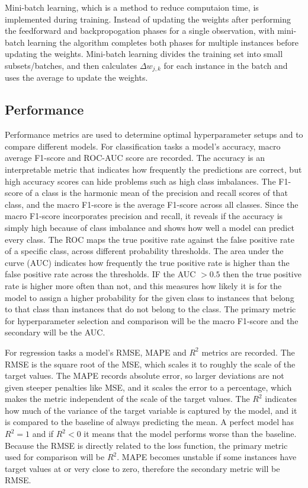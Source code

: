 \documentclass[conference]{IEEEtran}
\begin{document}
	Mini-batch learning, which is a method to reduce computaion time, is implemented during training. Instead of updating the weights after performing the feedforward and backpropogation phases for a single observation, with mini-batch learning the algorithm completes both phases for multiple instances before updating the weights. Mini-batch learning divides the training set into small subsets/batches, and then calculates $\Delta w_{j, k}$ for each instance in the batch and uses the average to update the weights.
	
	\subsection{Performance}
	\label{met:performance}
	Performance metrics are used to determine optimal hyperparameter setups and to compare different models. For classification tasks a model's accuracy, macro average F1-score and ROC-AUC score are recorded. The accuracy is an interpretable metric that indicates how frequently the predictions are correct, but high accuracy scores can hide problems such as high class imbalances. The F1-score of a class is the harmonic mean of the precision and recall scores of that class, and the macro F1-score is the average F1-score across all classes. Since the macro F1-score incorporates precision and recall, it reveals if the accuracy is simply high because of class imbalance and shows how well a model can predict every class. The ROC maps the true positive rate against the false positive rate of a specific class, across different probability thresholds. The area under the curve (AUC) indicates how frequently the true positive rate is higher than the false positive rate across the thresholds. IF the AUC $> 0.5$ then the true positive rate is higher more often than not, and this measures how likely it is for the model to assign a higher probability for the given class to instances that belong to that class than instances that do not belong to the class.  The primary metric for hyperparameter selection and comparison will be the macro F1-score and the secondary will be the AUC.
	
	For regression tasks a model's RMSE, MAPE and $R^2$ metrics are recorded. The RMSE is the square root of the MSE, which scales it to roughly the scale of the target values. The MAPE records absolute error, so larger deviations are not given steeper penalties like MSE, and it scales the error to a percentage, which makes the metric independent of the scale of the target values. The $R^2$ indicates how much of the variance of the target variable is captured by the model, and it is compared to the baseline of always predicting the mean. A perfect model has $R^2 = 1$ and if $R^2 < 0$ it means that the model performs worse than the baseline. Because the RMSE is directly related to the loss function, the primary metric used for comparison will be $R^2$. MAPE becomes unstable if some instances have target values at or very close to zero, therefore the secondary metric will be RMSE.
	
\end{document}
